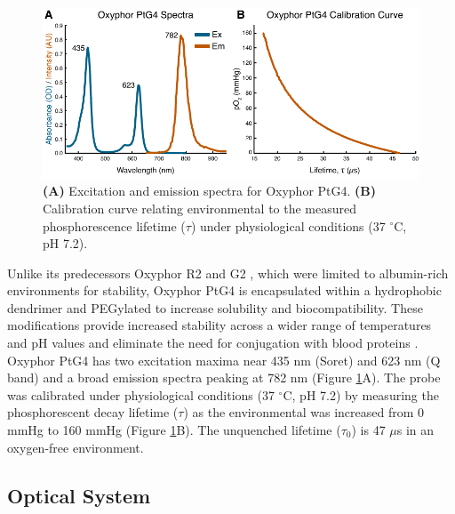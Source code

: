 \begin{figure}
    \includegraphics{figures/chapter_2/oxyphorptg4.pdf}
    \caption{
        \label{fig:oxyphor_ptg4}
        \textbf{(A)} Excitation and emission spectra for Oxyphor PtG4. \textbf{(B)} Calibration curve relating environmental  to the measured phosphorescence lifetime ($\tau$) under physiological conditions (37 $^\circ$C, pH 7.2).
    }
\end{figure}

Unlike its predecessors Oxyphor R2 and G2 \cite{Dunphy:2002tz}, which were limited to albumin-rich environments for stability, Oxyphor PtG4 is encapsulated within a hydrophobic dendrimer and PEGylated to increase solubility and biocompatibility. These modifications provide increased stability across a wider range of temperatures and pH values and eliminate the need for conjugation with blood proteins \cite{Esipova:2011hi}. Oxyphor PtG4 has two excitation maxima near 435 nm (Soret) and 623 nm (Q band) and a broad emission spectra peaking at 782 nm (Figure \ref{fig:oxyphor_ptg4}A). The probe was calibrated under physiological conditions (37 $^\circ$C, pH 7.2) by measuring the phosphorescent decay lifetime ($\tau$) as the environmental  was increased from 0 mmHg to 160 mmHg (Figure \ref{fig:oxyphor_ptg4}B). The unquenched lifetime ($\tau_0$) is 47 $\mu$s in an oxygen-free environment.

\subsection{Optical System}

